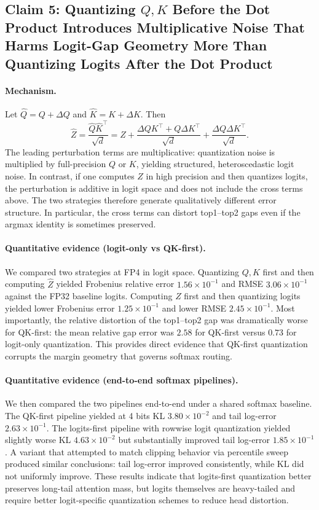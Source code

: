 \subsection{Claim 5: Quantizing $Q,K$ Before the Dot Product Introduces Multiplicative Noise That Harms Logit-Gap Geometry More Than Quantizing Logits After the Dot Product}

\paragraph{Mechanism.}
Let $\hat Q = Q+\Delta Q$ and $\hat K=K+\Delta K$. Then
\[
\widehat{Z} = \frac{\hat Q\hat K^\top}{\sqrt{d}}
= Z + \frac{\Delta QK^\top + Q\Delta K^\top}{\sqrt{d}} + \frac{\Delta Q\Delta K^\top}{\sqrt{d}}.
\]
The leading perturbation terms are multiplicative: quantization noise is multiplied by full-precision $Q$ or $K$, yielding structured, heteroscedastic logit noise. In contrast, if one computes $Z$ in high precision and then quantizes logits, the perturbation is additive in logit space and does not include the cross terms above. The two strategies therefore generate qualitatively different error structure. In particular, the cross terms can distort top1--top2 gaps even if the argmax identity is sometimes preserved.

\paragraph{Quantitative evidence (logit-only vs QK-first).}
We compared two strategies at FP4 in logit space. Quantizing $Q,K$ first and then computing $\widehat{Z}$ yielded Frobenius relative error $1.56\times 10^{-1}$ and RMSE $3.06\times 10^{-1}$ against the FP32 baseline logits. Computing $Z$ first and then quantizing logits yielded lower Frobenius error $1.25\times 10^{-1}$ and lower RMSE $2.45\times 10^{-1}$. Most importantly, the relative distortion of the top1--top2 gap was dramatically worse for QK-first: the mean relative gap error was $2.58$ for QK-first versus $0.73$ for logit-only quantization. This provides direct evidence that QK-first quantization corrupts the margin geometry that governs softmax routing.

\paragraph{Quantitative evidence (end-to-end softmax pipelines).}
We then compared the two pipelines end-to-end under a shared softmax baseline. The QK-first pipeline yielded at 4 bits KL $3.80\times 10^{-2}$ and tail log-error $2.63\times 10^{-1}$. The logits-first pipeline with rowwise logit quantization yielded slightly worse KL $4.63\times 10^{-2}$ but substantially improved tail log-error $1.85\times 10^{-1}$. A variant that attempted to match clipping behavior via percentile sweep produced similar conclusions: tail log-error improved consistently, while KL did not uniformly improve. These results indicate that logits-first quantization better preserves long-tail attention mass, but logits themselves are heavy-tailed and require better logit-specific quantization schemes to reduce head distortion.

